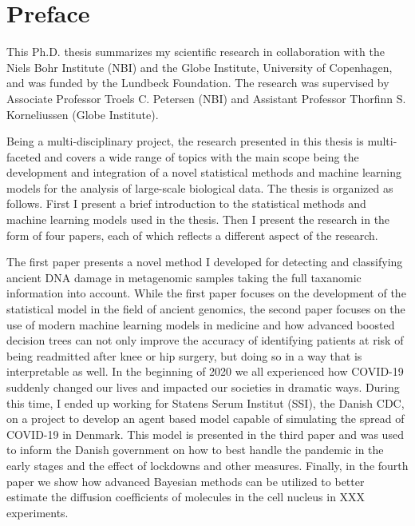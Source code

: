 \chapter{Preface}
This Ph.D. thesis summarizes my scientific research in collaboration with
the Niels Bohr Institute (NBI) and the Globe Institute, University of Copenhagen,
and was funded by the Lundbeck Foundation.
The research was supervised by Associate Professor Troels C. Petersen (NBI)
and Assistant Professor Thorfinn S. Korneliussen (Globe Institute).

Being a multi-disciplinary project, the research presented in this thesis is
multi-faceted and covers a wide range of topics with the main scope being
the development and integration of a novel statistical methods and machine learning
models for the analysis of large-scale biological data.
The thesis is organized as follows. First I present a brief introduction to
the statistical methods and machine learning models used in the thesis.
Then I present the research in the form of four papers, each of which reflects
a different aspect of the research.

The first paper presents a novel method I developed for
detecting and classifying ancient DNA damage in metagenomic samples taking the
full taxanomic information into account. While the first paper focuses on the
development of the statistical model in the field of ancient genomics,
the second paper focuses on the use of modern machine learning models in medicine
and how advanced boosted decision trees can not only improve the accuracy of
identifying patients at risk of being readmitted after knee or hip surgery,
but doing so in a way that is interpretable as well.
In the beginning of 2020 we all experienced how COVID-19 suddenly changed our lives
and impacted our societies in dramatic ways. During this time, I ended up working
for Statens Serum Institut (SSI), the Danish CDC, on a project to develop an
agent based model capable of simulating the spread of COVID-19 in Denmark.
This model is presented in the third paper and was used to inform the Danish
government on how to best handle the pandemic in the early stages and the effect
of lockdowns and other measures.
Finally, in the fourth paper we show how advanced Bayesian methods can be utilized
to better estimate the diffusion coefficients of molecules in the cell nucleus
in XXX experiments.

